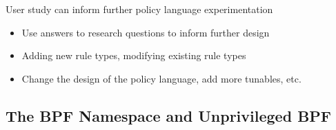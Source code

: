 \begin{inprogress}
  User study can inform further policy language experimentation
  \begin{itemize}
    \item Use answers to research questions to inform further design
    \item Adding new rule types, modifying existing rule types
    \item Change the design of the policy language, add more tunables, etc.
  \end{itemize}
\end{inprogress}

\subsection{The BPF Namespace and Unprivileged BPF}%
\label{ss:bpf-namespace}

